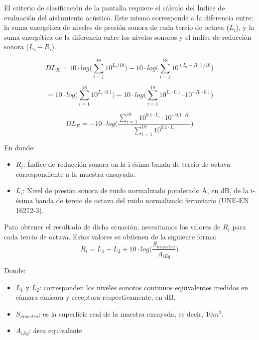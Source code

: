 \par El criterio de clasificación de la pantalla requiere el cálculo del Índice de evaluación del aislamiento acústico. Este mismo corresponde a la diferencia entre: la suma energética de niveles de presión sonora de cada tercio de octava ($L_i$), y la suma energética de la diferencia entre los niveles sonoros y el índice de reducción sonora ($L_i - R_i$).

$$
        DL_R  = 10 \cdot log \Big(\sum^{18}_{i=1} 10^{{L_i}/{10}} \Big) -10 \cdot log  \Big( \sum_{i=1}^{18} 10^{(L_i - R_i)/{10}} \Big) $$
    
$$
        = 10 \cdot log \Big(\sum^{18}_{i=1} 10^{{L_i}\cdot0.1} \Big) -10 \cdot log  \Big( \sum_{i=1}^{18} 10^{L_i\cdot0.1} \cdot 10^{-R_i\cdot0.1} \Big) $$
    
\begin{equation}
        DL_R = -10\cdot log \Big( \frac{\sum_{i=1}^{18} 10^{0.1 \cdot L_i} \cdot 10^{-0.1 \cdot R_i}}{\sum^{18}_{i=1} 10^{0.1 \cdot L_i} }\Big)
    \label{eq:DL_R}
\end{equation}

\par En donde:
\begin{itemize}
    \item $R_i$: Índice de reducción sonora en la i-ésima banda de tercio de octava correspondiente a la muestra ensayada.
    \item $L_i$: Nivel de presión sonora de ruido normalizado ponderado A, en dB, de la i-ésima banda de tercio de octava del ruido normalizado ferroviario (UNE-EN 16272-3).
\end{itemize}
    

\par Para obtener el resultado de dicha ecuación, necesitamos los valores de $R_i$ para cada tercio de octava. Estos valores se obtienen de la siguiente forma:
\begin{equation}
    R_i = L_1 - L_2 + 10 \cdot log \Big(\frac{S_{muestra}}{A_{iEq}}\Big)
    \label{eq:indice_reduccion_sonora}
\end{equation}

\par Donde:
\begin{itemize}
    \item $L_1$ y $L_2$: corresponden los niveles sonoros continuos equivalentes medidos en cámara emisora y receptora respectivamente, en dB.
    \item $S_{muestra}$: es la superficie real de la muestra ensayada, es decir, $10m^2$.
    \item $A_{iEq}$: área equivalente
\end{itemize}

